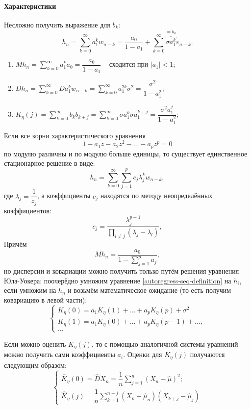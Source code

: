 \paragraph{Характеристики}

Несложно получить выражение для $b_k$:
\[
  h_n = \sum_{k=0}^\infty a_1^k w_{n-k} =
  \dfrac{a_0}{1 - a_1} + \sum_{k=0}^\infty \overbrace{\sigma a_1^k}^{= b_k} \varepsilon_{n-k}.
\]

\begin{enumerate}
  \item $Mh_n = \sum_{k=0}^\infty a_1^k a_0 = \dfrac{a_0}{1 - a_1}$ -- сходится при $|a_1| < 1$;
  \item $Dh_n = \sum_{k=0}^\infty D a_1^k w_{n-k} = \sum_{k=0}^\infty a_1^{2k} \sigma^2 = \dfrac{\sigma^2}{1 - a_1^2}$;
  \item $K_\eta(j) = \sum_{k=0}^\infty b_k b_{k+j} = \sum_{k=0}^\infty \sigma a_1^k \sigma a_1^{k+j} = \dfrac{\sigma^2 a_1^j}{1 - a_1^2}$;
\end{enumerate}

\begin{theorem}
  Если все корни характеристического уравнения
  \[
    1 - a_1 z - a_2 z^2 - \dots - a_p z^p = 0
  \]
  по модулю различны и по модулю больше единицы, то существует единственное стационарное решение
  в виде:
  \[
    h_n = \sum_{k=0}^\infty \sum_{j=1}^p c_j \lambda_j^k w_{n-k},
  \]
  где $\lambda_j = \dfrac{1}{z_j}$, а коэффициенты $c_j$ находятся по методу неопределённых коэффициентов:
  \[
    c_j = \dfrac{\lambda_j^{p-1}}{\prod_{l \neq j} (\lambda_j - \lambda_l)},
  \]
  Причём 
  \[
    Mh_n = \dfrac{a_0}{1 - \sum_{j=1}^p a_j},
  \]
  но дисперсии и ковариации можно получить только путём решения уравнения Юла-Уокера:
  поочерёдно умножим уравнение \eqref{autoregress-seq-definition} на $h_i$, если умножим
  на $h_n$ и возьмём математическое ожидание (то есть получим ковариацию в левой части):
  \[
    \begin{cases}
      K_\eta(0) = a_1 K_\eta(1) + \dots + a_p K_\eta(p) + \sigma^2 \\
      K_\eta(1) = a_1 K_\eta(0) + \dots + a_p K_\eta(p-1) + \dots, \\
      \dots
    \end{cases}
  \]
\end{theorem}

Если можно оценить $K_\eta(j)$, то с помощью аналогичной системы уравнений можно получить
сами коэффициенты $a_i$. Оценки для $K_\eta(j)$ получаются следующим образом:
\[
  \begin{cases}
    \hat{K}_\eta(0) = \hat{D} X_n = \dfrac{1}{n} \sum_{j=1}^n (X_n - \hat{\mu})^2; \\
    \hat{K}_\eta(j) = \dfrac{1}{n} \sum_{k=1}^{n-j} (X_k - \hat{\mu}_n) (X_{k+j} - \hat{\mu}_j)
  \end{cases}
\]
